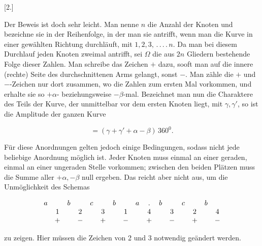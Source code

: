 %
\begin{center}[2.]\end{center}

Der Beweis ist doch sehr leicht. Man nenne $n$ die Anzahl der Knoten
und bezeichne sie in der Reihenfolge, in der man sie antrifft, wenn man die
Kurve in einer gewählten Richtung durchläuft, mit
$1, 2, 3,\,.\,.\,.\,.\,n$. Da man bei diesem Durchlauf jeden Knoten zweimal antrifft,
sei $\Omega$ die aus $2n$ Gliedern bestehende Folge dieser Zahlen.
Man schreibe das Zeichen $+$ dazu, sooft man auf die innere (rechte)
Seite des durchschnittenen Arms gelangt, sonst $-$. Man zähle die $+$ und
$-$-Zeichen nur dort zusammen, wo die Zahlen zum ersten Mal vorkommen, und
erhalte sie so $+\alpha$- beziehungsweise $-\beta$-mal. Bezeichnet man nun die Charaktere des Teils
der Kurve, der unmittelbar vor dem ersten Knoten liegt, mit $\gamma,
\gamma'$, so ist die Amplitude der ganzen Kurve

\[
= (\gamma+\gamma'+\alpha-\beta)\,360^0.
\]

Für diese Anordnungen gelten jedoch einige Bedingungen,
sodass nicht jede beliebige Anordnung möglich ist. Jeder
Knoten muss einmal an einer geraden, einmal an einer ungeraden
Stelle vorkommen; zwischen den beiden Plätzen muss die Summe aller
$+\alpha, -\beta$ null ergeben. Das reicht aber nicht aus, um die
Unmöglichkeit des Schemas

\[
\begin{array}{@{}*{16}{c}@{}}
a&&b&&c&&b&&a&.&b&&c&&b&\\
&1&&2&&3&&1&&4&&3&&2&&4\\
&+&&-&&+&&-&&+&&-&&+&&-
\end{array}
\]

zu zeigen. Hier müssen die Zeichen von 2 und 3 notwendig geändert
werden.

